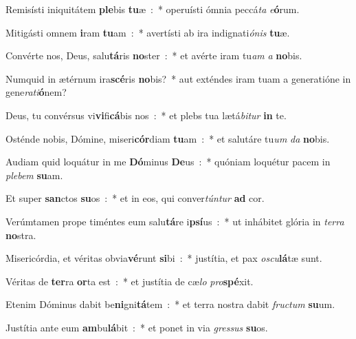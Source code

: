 ﻿\item Remisísti iniquitátem \textbf{ple}bis \textbf{tu}æ~:~* operuísti ómnia peccá\emph{ta} \emph{e}\textbf{ó}rum.
\item Mitigásti omnem \textbf{i}ram \textbf{tu}am~:~* avertísti ab ira indignati\emph{ó}\emph{nis} \textbf{tu}æ.
\item Convérte nos, Deus, salu\textbf{tá}ris \textbf{no}ster~:~* et avérte iram tu\emph{am} \emph{a} \textbf{no}bis.
\item Numquid in ætérnum ira\textbf{scé}ris \textbf{no}bis?~* aut exténdes iram tuam a generatióne in gene\emph{ra}\emph{ti}\textbf{ó}nem?
\item Deus, tu convérsus vi\textbf{vi}fi\textbf{cá}bis nos~:~* et plebs tua lætá\emph{bi}\emph{tur} \textbf{in} te.
\item Osténde nobis, Dómine, miseri\textbf{cór}diam \textbf{tu}am~:~* et salutáre tu\emph{um} \emph{da} \textbf{no}bis.
\item Audiam quid loquátur in me \textbf{Dó}minus \textbf{De}us~:~* quóniam loquétur pacem in \emph{ple}\emph{bem} \textbf{su}am.
\item Et super \textbf{san}ctos \textbf{su}os~:~* et in eos, qui conver\emph{tún}\emph{tur} \textbf{ad} cor.
\item Verúmtamen prope timéntes eum salu\textbf{tá}re i\textbf{psí}us~:~* ut inhábitet glória in \emph{ter}\emph{ra} \textbf{no}stra.
\item Misericórdia, et véritas obvia\textbf{vé}runt \textbf{si}bi~:~* justítia, et pax \emph{o}\emph{scu}\textbf{lá}tæ sunt.
\item Véritas de \textbf{ter}ra \textbf{or}ta est~:~* et justítia de cæ\emph{lo} \emph{pro}\textbf{spé}xit.
\item Etenim Dóminus dabit be\textbf{ni}gni\textbf{tá}tem~:~* et terra nostra dabit \emph{fru}\emph{ctum} \textbf{su}um.
\item Justítia ante eum \textbf{am}bu\textbf{lá}bit~:~* et ponet in via \emph{gres}\emph{sus} \textbf{su}os.